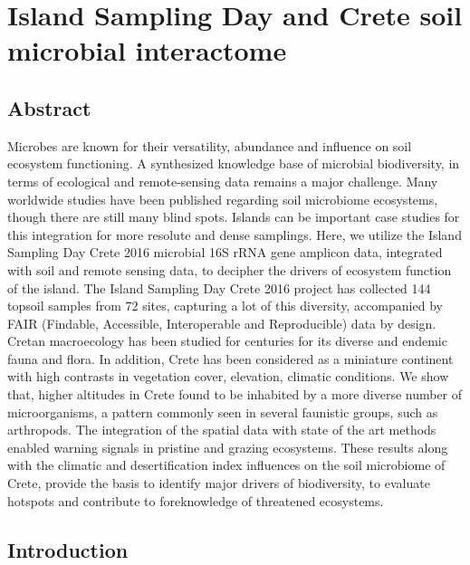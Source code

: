 % 
% 


\chapter{Island Sampling Day and Crete soil microbial interactome}
\label{cha:crete-soil}



\section{Abstract}
    Microbes are known for their versatility, abundance
    and influence on soil ecosystem functioning.
    A synthesized knowledge base of microbial biodiversity, in terms of
    ecological and remote-sensing data remains a major challenge.
    Many worldwide studies have been published regarding soil
    microbiome ecosystems, though there are still many blind spots.
    Islands can be important case studies for this integration for more resolute and dense samplings.
    Here, we utilize the Island Sampling Day Crete 2016 microbial 16S rRNA gene
    amplicon data, integrated with soil and remote
    sensing data, to decipher the drivers of ecosystem function of the island.
    The Island Sampling Day Crete 2016 project has collected 144 topsoil samples
    from 72 sites, capturing a lot of this diversity, accompanied by FAIR
    (Findable, Accessible, Interoperable and Reproducible) data by design. 
    Cretan macroecology has been studied for centuries for its diverse  and endemic
    fauna and flora.
    In addition, Crete has been considered as a miniature continent with high contrasts in
    vegetation cover, elevation, climatic conditions. 
    We show that, higher altitudes in Crete found to
    be inhabited by a more diverse number of microorganisms, a pattern commonly
    seen in several faunistic groups, such as arthropods.
    The integration of the spatial data with state of the art methods enabled warning signals
    in pristine and grazing ecosystems.
    These results along with the
    climatic and desertification index influences on the soil microbiome of Crete,
    provide the basis to identify major drivers of biodiversity, to evaluate hotspots
    and contribute to foreknowledge of threatened ecosystems.

\section{Introduction}\label{intro}

